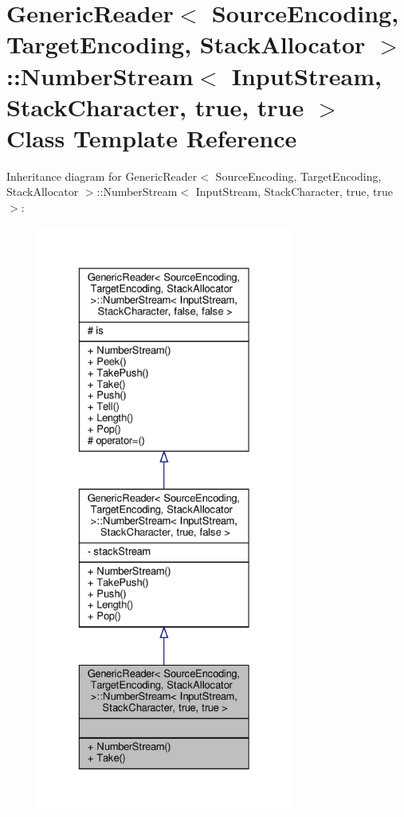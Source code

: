 \hypertarget{classGenericReader_1_1NumberStream_3_01InputStream_00_01StackCharacter_00_01true_00_01true_01_4}{}\section{Generic\+Reader$<$ Source\+Encoding, Target\+Encoding, Stack\+Allocator $>$\+:\+:Number\+Stream$<$ Input\+Stream, Stack\+Character, true, true $>$ Class Template Reference}
\label{classGenericReader_1_1NumberStream_3_01InputStream_00_01StackCharacter_00_01true_00_01true_01_4}


Inheritance diagram for Generic\+Reader$<$ Source\+Encoding, Target\+Encoding, Stack\+Allocator $>$\+:\+:Number\+Stream$<$ Input\+Stream, Stack\+Character, true, true $>$\+:
\nopagebreak
\begin{figure}[H]
\begin{center}
\leavevmode
\includegraphics[height=550pt]{classGenericReader_1_1NumberStream_3_01InputStream_00_01StackCharacter_00_01true_00_01true_01_4__inherit__graph}
\end{center}
\end{figure}


